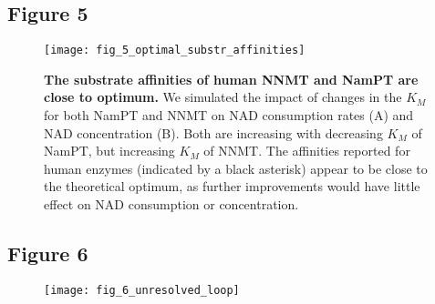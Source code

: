 \newpage


\subsection*{Figure 5}

\begin{figure}[ht]
  \centering
  \texttt{[image: fig\_5\_optimal\_substr\_affinities]}
  \caption{\textbf{The substrate affinities of human NNMT and NamPT are close to optimum.} We simulated the impact of changes in the $K_{M}$ for both NamPT and NNMT on NAD consumption rates (A) and NAD concentration (B). Both are increasing with decreasing $K_{M}$ of NamPT, but increasing $K_{M}$ of NNMT. The affinities reported for human enzymes (indicated by a black asterisk) appear to be close to the theoretical optimum, as further improvements would have little effect on NAD consumption or concentration.}
  \label{fig:optimal_substr_affinities}
\end{figure}

\newpage


\subsection*{Figure 6}

\begin{figure}[ht]
  \centering
  \texttt{[image: fig\_6\_unresolved\_loop]}
\end{figure}

\newpage

